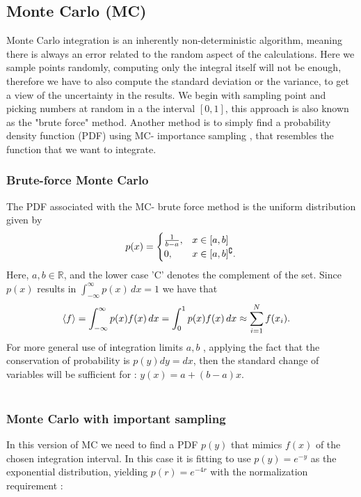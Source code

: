 \documentclass{article}
\begin{document}
\subsection{Monte Carlo (MC) }\label{const_mot}
Monte Carlo integration is an inherently non-deterministic algorithm, meaning there is always an error related to the random aspect of the calculations. Here we sample points randomly, computing only the integral itself will not be enough, therefore we have to also compute the standard deviation or the variance, to get a view of the uncertainty in the results. We begin with sampling point and picking numbers at random in a the interval $[0, 1]$, this approach is also known as the "brute force" method. Another method is to simply find a probability density function (PDF) using MC- importance sampling , that resembles the function that we want to integrate.


\subsubsection{Brute-force Monte Carlo}
\label{sub:brute_force_monte_carlo}

The PDF associated with the MC- brute force method is
the uniform distribution given by
\begin{equation}
  \notag
  p(x) = \begin{cases}
    \frac{1}{b-a}, & x \in [a, b] \\
    0, & x \in [a, b]^{\complement}.
  \end{cases}
\end{equation}
Here, $a,b \in \mathbb{R}$, and the lower case 'C' denotes the complement of the set.
Since $p(x)$ results in  $\int_{-\infty}^\infty p(x) \, dx = 1$ we have that
\begin{align*}
  \notag
  \langle f \rangle = \int_{-\infty}^\infty p(x) f(x) \, dx = \int_0^1 p(x)f(x) \, dx &\approx \sum^{N}_{i=1} f(x_i).
\end{align*}
For more general use of integration limits $a, b$ , applying the fact that the conservation of probability is  $p(y)dy = dx$, then the standard change
of variables will be sufficient for : $y(x) = a + (b - a)x$.\\\

\subsubsection{Monte Carlo with important sampling}\label{const_mot}

In this version of MC we need to find a PDF  $p(y)$ that mimics  $f(x)$ of the chosen integration interval.  In this case it is fitting to use  $p(y) = e^{-y}$ as the exponential distribution, yielding $p(r) = e^{-4r}$ with the normalization requirement :
\end{document}
